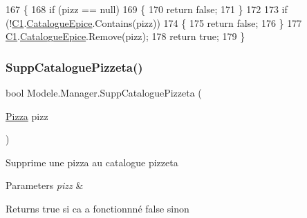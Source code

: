 \begin{DoxyCode}
167         \{
168             \textcolor{keywordflow}{if} (pizz == null)
169             \{
170                 \textcolor{keywordflow}{return} \textcolor{keyword}{false};
171             \}
172 
173             \textcolor{keywordflow}{if} (!\hyperlink{classModele_1_1Manager_a54bbc7bd646fcaa0f1a590310dd3c02c}{C1}.\hyperlink{classModele_1_1Catalogue_a633610212f42551a5755212e21bedbca}{CatalogueEpice}.Contains(pizz))
174             \{
175                 \textcolor{keywordflow}{return} \textcolor{keyword}{false};
176             \}
177             \hyperlink{classModele_1_1Manager_a54bbc7bd646fcaa0f1a590310dd3c02c}{C1}.\hyperlink{classModele_1_1Catalogue_a633610212f42551a5755212e21bedbca}{CatalogueEpice}.Remove(pizz);
178             \textcolor{keywordflow}{return} \textcolor{keyword}{true};
179         \}
\end{DoxyCode}
\mbox{\label{classModele_1_1Manager_ac0e999997599e5694fa82a678c4d2fbe}} 
\subsubsection{\texorpdfstring{Supp\+Catalogue\+Pizzeta()}{SuppCataloguePizzeta()}}
{\footnotesize\ttfamily bool Modele.\+Manager.\+Supp\+Catalogue\+Pizzeta (\begin{DoxyParamCaption}\item[{\hyperlink{classModele_1_1Pizza}{Pizza}}]{pizz }\end{DoxyParamCaption})\hspace{0.3cm}{\ttfamily [inline]}}



Supprime une pizza au catalogue pizzeta 


\begin{DoxyParams}{Parameters}
{\em pizz} & \\
\hline
\end{DoxyParams}
\begin{DoxyReturn}{Returns}
true si ca a fonctionnné false sinon
\end{DoxyReturn}

